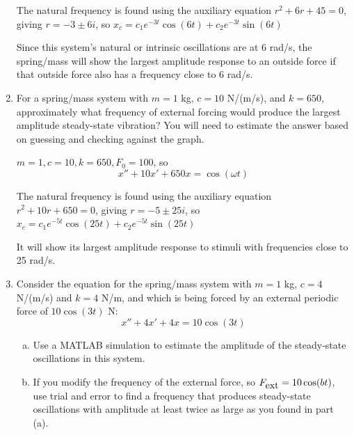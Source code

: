 \begin{enumerate}
 \begin{Solution}
   The natural frequency is found using the auxiliary equation $r^2 +
   6r + 45 = 0$, giving $r=-3 \pm 6i$, so $x_c = c_1 e^{-3t}\cos(6t) +
   c_2 e^{-3t} \sin(6t)$

 Since this system's natural or intrinsic oscillations are at 6 rad/s,
 the spring/mass will show the largest amplitude response to an outside
 force if that outside force also has a frequency close to 6 rad/s.

 \end{Solution}

\item 
\begin{Question}
For a spring/mass system with $m=1$ kg, $c=10$ N/(m/s), and
  $k=650$, approximately what frequency of external forcing would
  produce the largest amplitude steady-state vibration?
You will need to estimate
  the answer based on guessing and checking against the graph.
\end{Question}

\begin{Solution}
$m=1, c=10,k=650,F_0=100$, so
$$x'' + 10x' + 650x = \cos(\omega t)$$ 

The natural frequency is found using the auxiliary equation $r^2 + 10r
+ 650 = 0$, giving $r=-5 \pm 25i$, so $x_c = c_1 e^{-5t}\cos(25t) +
c_2 e^{-5t} \sin(25t)$

It will show its largest amplitude response to stimuli with
frequencies close to 25 rad/s.
\end{Solution}

\item 
  \begin{Question} 
    Consider the equation for the spring/mass system with $m=1$ kg,
    $c=4$ N/(m/s) and $k = 4$ N/m, and which is being forced by an
    external periodic force of $10 \cos(3t)$ N:
    $$x'' + 4x' + 4x = 10 \cos(3t)$$
    \begin{enumerate}[(a)]
    \item Use a MATLAB simulation to estimate the amplitude of the
      steady-state oscillations in this system.
    \item If you modify the frequency of the external force, so
      $F_{\mbox{ext}} = 10 \cos(bt)$, use trial and error to find a frequency
      that produces steady-state oscillations with amplitude at least
      twice as large as you found in part (a).
    \end{enumerate}
\end{Question}


\end{enumerate}
